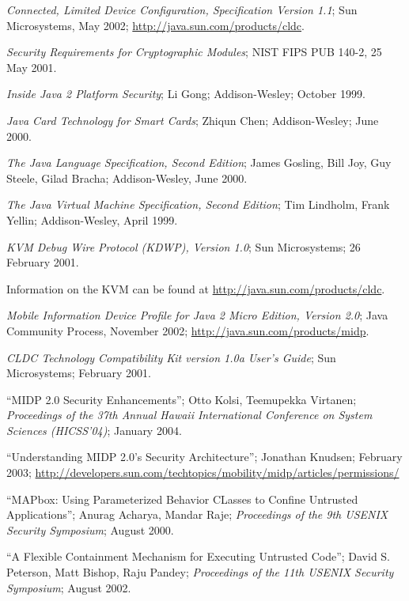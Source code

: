 \documentclass{llncs}
\begin{document}
%
%
\begin{thebibliography}{99}
%
\emph{Connected, Limited Device Configuration, Specification Version 1.1};
Sun Microsystems, May 2002;
\url{http://java.sun.com/products/cldc}.

\emph{Security Requirements for Cryptographic Modules};
NIST FIPS PUB 140-2, 25 May 2001.

\emph{Inside Java 2 Platform Security};
Li Gong;
Addison-Wesley; October 1999.

\emph{Java Card Technology for Smart Cards};
 Zhiqun Chen;
 Addison-Wesley; June 2000.

\emph{The Java Language Specification, Second Edition};
James Gosling, Bill Joy, Guy Steele, Gilad Bracha;
Addison-Wesley, June 2000.

\emph{The Java Virtual Machine Specification, Second Edition};
Tim Lindholm, Frank Yellin;
Addison-Wesley, April 1999.

\emph{KVM Debug Wire Protocol (KDWP), Version 1.0};
Sun Microsystems;
26 February 2001.

Information on the KVM can be found at \url{http://java.sun.com/products/cldc}.

\emph{Mobile Information Device Profile for Java 2 Micro Edition, Version 2.0};
Java Community Process, November 2002;
\url{http://java.sun.com/products/midp}.

\emph{CLDC Technology Compatibility Kit version 1.0a User's Guide};
Sun Microsystems;
February 2001.

``MIDP 2.0 Security Enhancements'';
Otto Kolsi, Teemupekka Virtanen;
\emph{Proceedings of the 37th Annual Hawaii International Conference on System Sciences (HICSS'04)};
January 2004.

``Understanding MIDP 2.0's Security Architecture'';
Jonathan Knudsen;
February 2003;
\url{http://developers.sun.com/techtopics/mobility/midp/articles/permissions/}

``MAPbox: Using Parameterized Behavior CLasses to Confine Untrusted Applications'';
Anurag Acharya, Mandar Raje;
\emph{Proceedings of the 9th USENIX Security Symposium};
August 2000.

``A Flexible Containment Mechanism for Executing Untrusted Code'';
David S. Peterson, Matt Bishop, Raju Pandey;
\emph{Proceedings of the 11th USENIX Security Symposium};
August 2002.


\end{thebibliography}
\end{document}
